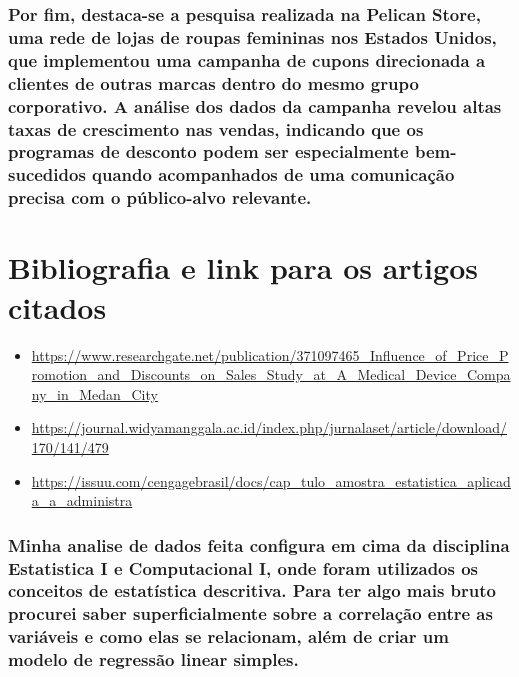 \documentclass[
]{article}
\begin{document}
\subsubsection{Por fim, destaca-se a pesquisa realizada na Pelican
Store, uma rede de lojas de roupas femininas nos Estados Unidos, que
implementou uma campanha de cupons direcionada a clientes de outras
marcas dentro do mesmo grupo corporativo. A análise dos dados da
campanha revelou altas taxas de crescimento nas vendas, indicando que os
programas de desconto podem ser especialmente bem-sucedidos quando
acompanhados de uma comunicação precisa com o público-alvo
relevante.}\label{por-fim-destaca-se-a-pesquisa-realizada-na-pelican-store-uma-rede-de-lojas-de-roupas-femininas-nos-estados-unidos-que-implementou-uma-campanha-de-cupons-direcionada-a-clientes-de-outras-marcas-dentro-do-mesmo-grupo-corporativo.-a-anuxe1lise-dos-dados-da-campanha-revelou-altas-taxas-de-crescimento-nas-vendas-indicando-que-os-programas-de-desconto-podem-ser-especialmente-bem-sucedidos-quando-acompanhados-de-uma-comunicauxe7uxe3o-precisa-com-o-puxfablico-alvo-relevante.}

\section{Bibliografia e link para os artigos
citados}\label{bibliografia-e-link-para-os-artigos-citados}

\begin{itemize}
\item
  \url{https://www.researchgate.net/publication/371097465_Influence_of_Price_Promotion_and_Discounts_on_Sales_Study_at_A_Medical_Device_Company_in_Medan_City}
\item
  \url{https://journal.widyamanggala.ac.id/index.php/jurnalaset/article/download/170/141/479}
\item
  \url{https://issuu.com/cengagebrasil/docs/cap_tulo_amostra_estatistica_aplicada_a_administra}
\end{itemize}

\subsubsection{Minha analise de dados feita configura em cima da
disciplina Estatistica I e Computacional I, onde foram utilizados os
conceitos de estatística descritiva. Para ter algo mais bruto procurei
saber superficialmente sobre a correlação entre as variáveis e como elas
se relacionam, além de criar um modelo de regressão linear
simples.}\label{minha-analise-de-dados-feita-configura-em-cima-da-disciplina-estatistica-i-e-computacional-i-onde-foram-utilizados-os-conceitos-de-estatuxedstica-descritiva.-para-ter-algo-mais-bruto-procurei-saber-superficialmente-sobre-a-correlauxe7uxe3o-entre-as-variuxe1veis-e-como-elas-se-relacionam-aluxe9m-de-criar-um-modelo-de-regressuxe3o-linear-simples.}
\end{document}

